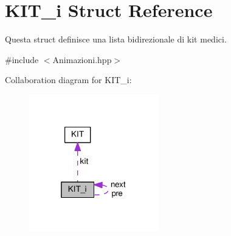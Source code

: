 \hypertarget{structKIT__i}{}\section{K\+I\+T\+\_\+i Struct Reference}
\label{structKIT__i}


Questa struct definisce una lista bidirezionale di kit medici.  




{\ttfamily \#include $<$Animazioni.\+hpp$>$}



Collaboration diagram for K\+I\+T\+\_\+i\+:\nopagebreak
\begin{figure}[H]
\begin{center}
\leavevmode
\includegraphics[width=160pt]{structKIT__i__coll__graph}
\end{center}
\end{figure}
